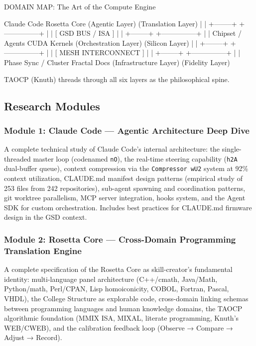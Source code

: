 \documentclass[11pt,letterpaper]{article}
\begin{document}
\begin{asciibox}
DOMAIN MAP: The Art of the Compute Engine

  Claude Code                    Rosetta Core
  (Agentic Layer)                (Translation Layer)
       |                               |
       +--------+     +---------------+
                |     |
          [ GSD BUS / ISA ]
                |     |
       +--------+     +---------------+
       |                               |
  Chipset / Agents              CUDA Kernels
  (Orchestration Layer)         (Silicon Layer)
       |                               |
       +--------+     +---------------+
                |     |
          [ MESH INTERCONNECT ]
                |     |
       +--------+     +---------------+
       |                               |
  Phase Sync / Cluster          Fractal Docs
  (Infrastructure Layer)        (Fidelity Layer)
  
  TAOCP (Knuth) threads through all six layers as the philosophical spine.
\end{asciibox}

\subsection{Research Modules}

\subsubsection{Module 1: Claude Code --- Agentic Architecture Deep Dive}

A complete technical study of Claude Code's internal architecture: the single-threaded master loop (codenamed \texttt{nO}), the real-time steering capability (\texttt{h2A} dual-buffer queue), context compression via the \texttt{Compressor wU2} system at 92\% context utilization, CLAUDE.md manifest design patterns (empirical study of 253 files from 242 repositories), sub-agent spawning and coordination patterns, git worktree parallelism, MCP server integration, hooks system, and the Agent SDK for custom orchestration. Includes best practices for CLAUDE.md firmware design in the GSD context.

\subsubsection{Module 2: Rosetta Core --- Cross-Domain Programming Translation Engine}

A complete specification of the Rosetta Core as skill-creator's fundamental identity: multi-language panel architecture (C++/cmath, Java/Math, Python/math, Perl/CPAN, Lisp homoiconicity, COBOL, Fortran, Pascal, VHDL), the College Structure as explorable code, cross-domain linking schemas between programming languages and human knowledge domains, the TAOCP algorithmic foundation (MMIX ISA, MIXAL, literate programming, Knuth's WEB/CWEB), and the calibration feedback loop (Observe → Compare → Adjust → Record).
\end{document}
